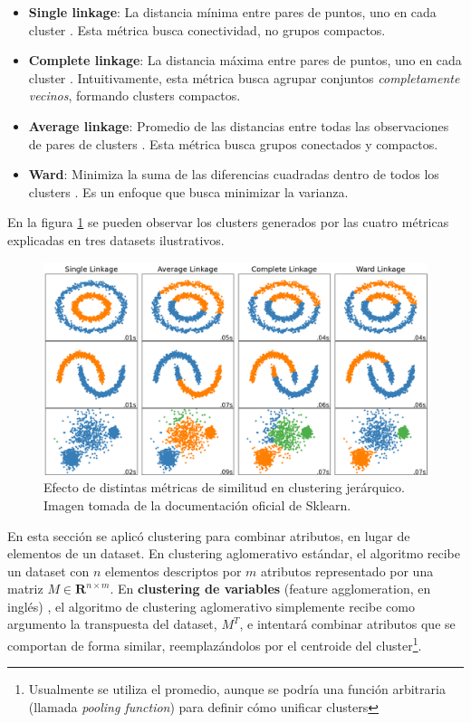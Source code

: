 \begin{itemize}
\item \textbf{Single linkage}: La distancia mínima entre pares de puntos, uno en cada cluster \cite{iretrieval}. Esta métrica busca conectividad, no grupos compactos.   

\item \textbf{Complete linkage}: La distancia máxima entre pares de puntos, uno en cada cluster \cite{iretrieval}. Intuitivamente, esta métrica busca agrupar conjuntos \textit{completamente vecinos}, formando clusters compactos. 

\item \textbf{Average linkage}: Promedio de las distancias entre todas las observaciones de pares de clusters \cite{iretrieval}. Esta métrica busca grupos conectados y compactos.

\item \textbf{Ward}: Minimiza la suma de las diferencias cuadradas dentro de todos los clusters \cite{ward}. Es un enfoque que busca minimizar la varianza.
\end{itemize}

En la figura \ref{fig:linkages} se pueden observar los clusters generados por las cuatro métricas explicadas en tres datasets ilustrativos. \\

\begin{figure}[h!]
 \includegraphics[width=\textwidth]{Kap5/jerarquico_tecnicas.png}
\caption{Efecto de distintas métricas de similitud en clustering jerárquico. Imagen tomada de la documentación oficial de Sklearn.}
\label{fig:linkages}
\end{figure}

En esta sección se aplicó clustering para combinar atributos, en lugar de elementos de un dataset. En clustering aglomerativo estándar, el algoritmo recibe un dataset con $n$ elementos descriptos por $m$ atributos representado por una matriz $M \in \mathbf{R}^{n \times m}$. En \textbf{clustering de variables} (feature agglomeration, en inglés) \cite{fs3}, el algoritmo de clustering aglomerativo simplemente recibe como argumento la transpuesta del dataset, $M^T$, e intentará combinar atributos que se comportan de forma similar, reemplazándolos por el centroide del cluster\footnote{Usualmente se utiliza el promedio, aunque se podría una función arbitraria (llamada \textit{pooling function}) para definir cómo unificar clusters }. \\

